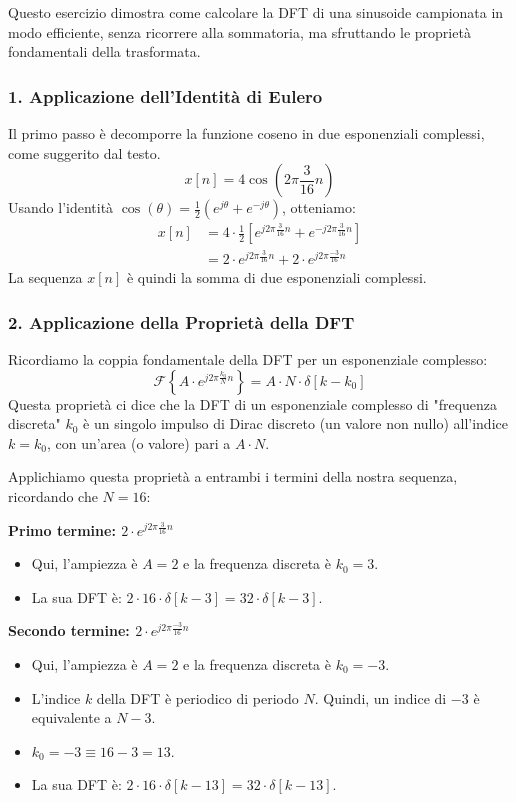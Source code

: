 
\begin{soluzione}{12}
    Questo esercizio dimostra come calcolare la DFT di una sinusoide campionata in modo efficiente, senza ricorrere alla sommatoria, ma sfruttando le proprietà fondamentali della trasformata.

    \subsubsection*{1. Applicazione dell'Identità di Eulero}
    Il primo passo è decomporre la funzione coseno in due esponenziali complessi, come suggerito dal testo.
    \[
        x[n] = 4 \cos\left(2\pi \frac{3}{16} n\right)
    \]
    Usando l'identità $\cos(\theta) = \frac{1}{2}(e^{j\theta} + e^{-j\theta})$, otteniamo:
    \begin{align*}
        x[n] &= 4 \cdot \frac{1}{2} \left[ e^{j2\pi\frac{3}{16}n} + e^{-j2\pi\frac{3}{16}n} \right] \\
        &= 2 \cdot e^{j2\pi\frac{3}{16}n} + 2 \cdot e^{j2\pi\frac{-3}{16}n}
    \end{align*}
    La sequenza $x[n]$ è quindi la somma di due esponenziali complessi.

    \subsubsection*{2. Applicazione della Proprietà della DFT}
    Ricordiamo la coppia fondamentale della DFT per un esponenziale complesso:
    \[
        \mathcal{F}\left\{ A \cdot e^{j2\pi\frac{k_0}{N}n} \right\} = A \cdot N \cdot \delta[k - k_0]
    \]
    Questa proprietà ci dice che la DFT di un esponenziale complesso di "frequenza discreta" $k_0$ è un singolo impulso di Dirac discreto (un valore non nullo) all'indice $k = k_0$, con un'area (o valore) pari a $A \cdot N$.
    
    Applichiamo questa proprietà a entrambi i termini della nostra sequenza, ricordando che $N=16$:
    
    \textbf{Primo termine: $2 \cdot e^{j2\pi\frac{3}{16}n}$}
    \begin{itemize}
        \item Qui, l'ampiezza è $A=2$ e la frequenza discreta è $k_0=3$.
        \item La sua DFT è: $2 \cdot 16 \cdot \delta[k - 3] = 32 \cdot \delta[k - 3]$.
    \end{itemize}
    
    \textbf{Secondo termine: $2 \cdot e^{j2\pi\frac{-3}{16}n}$}
    \begin{itemize}
        \item Qui, l'ampiezza è $A=2$ e la frequenza discreta è $k_0=-3$.
        \item L'indice $k$ della DFT è periodico di periodo $N$. Quindi, un indice di $-3$ è equivalente a $N-3$.
        \item $k_0 = -3 \equiv 16 - 3 = 13$.
        \item La sua DFT è: $2 \cdot 16 \cdot \delta[k - 13] = 32 \cdot \delta[k - 13]$.
    \end{itemize}
    

\end{soluzione}
